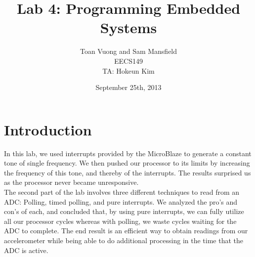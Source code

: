 \documentclass[10pt,titlepage]{article}
\begin{document}
  \title{Lab 4: Programming Embedded Systems}
  \author{Toan Vuong and Sam Mansfield\\
          EECS149\\
          TA: Hokeun Kim}
  \date{September 25th, 2013}
  \maketitle

  \section*{Introduction}
  In this lab, we used interrupts provided by the MicroBlaze to generate a constant tone of single frequency. We then pushed our processor to its limits by increasing the frequency of this tone, and thereby of the interrupts. The results surprised us as the processor never became unresponsive. \\
  The second part of the lab involves three different techniques to read from an ADC: Polling, timed polling, and pure interrupts. We analyzed the pro's and con's of each, and concluded that, by using pure interrupts, we can fully utilize all our processor cycles whereas with polling, we waste cycles waiting for the ADC to complete. The end result is an efficient way to obtain readings from our accelerometer while being able to do additional processing in the time that the ADC is active.
\end{document}
